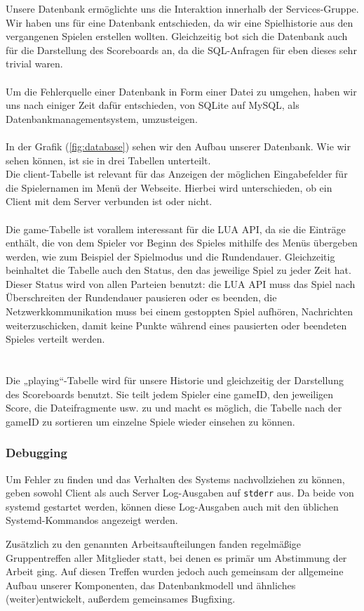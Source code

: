 Unsere Datenbank ermöglichte uns die Interaktion innerhalb der Services-Gruppe. Wir haben uns für eine Datenbank entschieden, da wir eine Spielhistorie aus den vergangenen Spielen erstellen wollten. Gleichzeitig bot sich die Datenbank auch für die Darstellung des Scoreboards an, da die SQL-Anfragen für eben dieses sehr trivial waren.\\\\
Um die Fehlerquelle einer Datenbank in Form einer Datei zu umgehen, haben wir uns nach einiger Zeit dafür entschieden, von SQLite auf MySQL, als Datenbankmanagementsystem, umzusteigen.\\\\

In der Grafik (\cref{fig:database}) sehen wir den Aufbau unserer Datenbank. Wie wir sehen können, ist sie in drei Tabellen unterteilt.\\
Die client-Tabelle ist relevant für das Anzeigen der möglichen Eingabefelder für die Spielernamen im Menü der Webseite. Hierbei wird unterschieden, ob ein Client mit dem Server verbunden ist oder nicht.\\\\
Die game-Tabelle ist vorallem interessant für die LUA API, da sie die Einträge enthält, die von dem Spieler vor Beginn des Spieles mithilfe des Menüs übergeben werden, wie zum Beispiel der Spielmodus und die Rundendauer. Gleichzeitig beinhaltet die Tabelle auch den Status, den das jeweilige Spiel zu jeder Zeit hat. Dieser Status wird von allen Parteien benutzt: die LUA API muss das Spiel nach Überschreiten der Rundendauer pausieren oder es beenden, die Netzwerkkommunikation muss bei einem gestoppten Spiel aufhören, Nachrichten weiterzuschicken, damit keine Punkte während eines pausierten oder beendeten Spieles verteilt werden.\\\\\\
Die „playing“-Tabelle wird für unsere Historie und gleichzeitig der Darstellung des Scoreboards benutzt. Sie teilt jedem Spieler eine gameID, den jeweiligen Score, die Dateifragmente usw. zu und macht es möglich, die Tabelle nach der gameID zu sortieren um einzelne Spiele wieder einsehen zu können.

\subsubsection{Debugging}

Um Fehler zu finden und das Verhalten des Systems nachvollziehen zu können, geben sowohl Client als auch Server Log-Ausgaben auf \texttt{stderr} aus. Da beide von systemd gestartet werden, können diese Log-Ausgaben auch mit den üblichen Systemd-Kommandos angezeigt werden.\newline

Zusätzlich zu den genannten Arbeitsaufteilungen fanden regelmäßige Gruppentreffen aller Mitglieder statt, bei denen es primär um Abstimmung der Arbeit ging. Auf diesen Treffen wurden jedoch auch gemeinsam der allgemeine Aufbau unserer Komponenten, das Datenbankmodell und ähnliches (weiter)entwickelt, außerdem gemeinsames Bugfixing.


